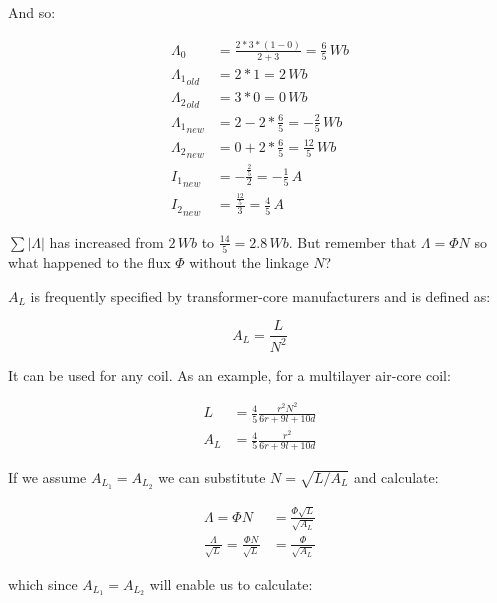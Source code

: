 \documentclass[]{../common/elementary-physics}
\begin{document}
And so:

\begin{subequations}
\begin{align}
\Lambda_0 &= \frac{2 * 3 * (1-0)}{2 + 3} = \frac{6}{5} \, Wb \\
{\Lambda_1}_{old} &= 2 * 1 = 2 \, Wb \\
{\Lambda_2}_{old} &= 3 * 0 = 0 \, Wb \\
{\Lambda_1}_{new} &= 2 -2 * \frac{6}{5} = -\frac{2}{5} \, Wb \\
{\Lambda_2}_{new} &= 0 +2 * \frac{6}{5} = \frac{12}{5} \, Wb \\
{I_1}_{new} &= -\frac{\frac{2}{5}}{2} = -\frac{1}{5} \, A \\
{I_2}_{new} &= \frac{\frac{12}{5}}{3} = \frac{4}{5} \, A
\end{align}
\end{subequations}

$\sum |\Lambda|$ has increased from $2 \, Wb$ to $\frac{14}{5} = 2.8 \, Wb$.
But remember that $\Lambda = \Phi N$ so what happened to the flux $\Phi$ without the linkage $N$?

$A_L$ is frequently specified by transformer-core manufacturers and is defined as:

\begin{equation}
A_L = \frac{L}{N^2}
\end{equation}

It can be used for any coil.
As an example, for a multilayer air-core coil\cite{wpind}:

\begin{subequations}
\begin{align}
L &= \frac{4}{5} \frac{r^2 N^2}{6r+9l+10d} \\
A_L &= \frac{4}{5} \frac{r^2}{6r+9l+10d}
\end{align}
\end{subequations}

If we assume $A_{L_1} = A_{L_2}$ we can substitute $N = \sqrt{L/A_L}$ and calculate:

\begin{subequations}
\begin{align}
\Lambda = \Phi N &= \frac{\Phi \sqrt{L}}{\sqrt{A_L}} \\
\frac{\Lambda}{\sqrt{L}} = \frac{\Phi N}{\sqrt{L}} &= \frac{\Phi}{\sqrt{A_L}}
\end{align}
\end{subequations}

which since $A_{L_1} = A_{L_2}$ will enable us to calculate:
\end{document}
